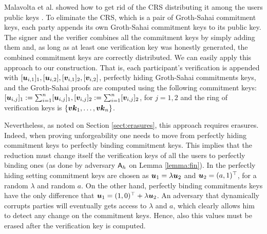 Malavolta et al. showed how to get rid of the CRS distributing it among the users public keys \cite{AC:MalSch17}. To eliminate the CRS, which is a pair of Groth-Sahai commitment keys, each party appends its own Groth-Sahai commitment keys to its public key. The signer and the verifier combines all the commitment keys by simply adding them and, as long as at least one verification key was honestly generated, the combined commitment keys are correctly distributed. We can easily apply this approach to our construction. That is, each participant's verification is appended with $[{\boldsymbol{u}}_{i,1}]_1,[{\boldsymbol{u}}_{i,2}],[{\boldsymbol{v}}_{i,1}]_2,[{\boldsymbol{v}}_{i,2}]$, perfectly hiding Groth-Sahai commitments keys, and the Groth-Sahai proofs are computed using the following commitment keys: $[{\boldsymbol{u}}_{i,j}]_1 :=\sum_{i=1}^n [{\boldsymbol{u}}_{i,j}]_1,[{\boldsymbol{v}}_{i,j}]_2 :=\sum_{i=1}^n [{\boldsymbol{v}}_{i,j}]_2$, for $j=1,2$ and the ring of verification keys is $\{{\boldsymbol{vk}}_1,\ldots,{\boldsymbol{vk}}_n\}$.

Nevertheless, as noted on Section \ref{sect:erasures}, this approach requires erasures. Indeed, when proving unforgeability one needs to move from perfectly hiding commitment keys to perfectly binding commitment keys. This implies that the reduction must change itself the verification keys of all the users to perfectly binding ones (as done by adversary $\mathsf{A}_h$ on Lemma \ref{lemma:fin}). In the perfectly hiding setting commitment keys are chosen as ${\boldsymbol{u}}_1 = \lambda{\boldsymbol{u}}_2$ and ${\boldsymbol{u}}_2 = (a,1)^\top$, for a random $\lambda$ and random $a$.  On the other hand, perfectly binding commitments keys have the only difference that ${\boldsymbol{u}}_1 = (1,0)^\top+\lambda{\boldsymbol{u}}_2$. An adversary that dynamically corrupts parties will eventually gets access to $\lambda$ and $a$, which clearly allows him to detect any change on the commitment keys. Hence, also this values must be erased after the verification key is computed.